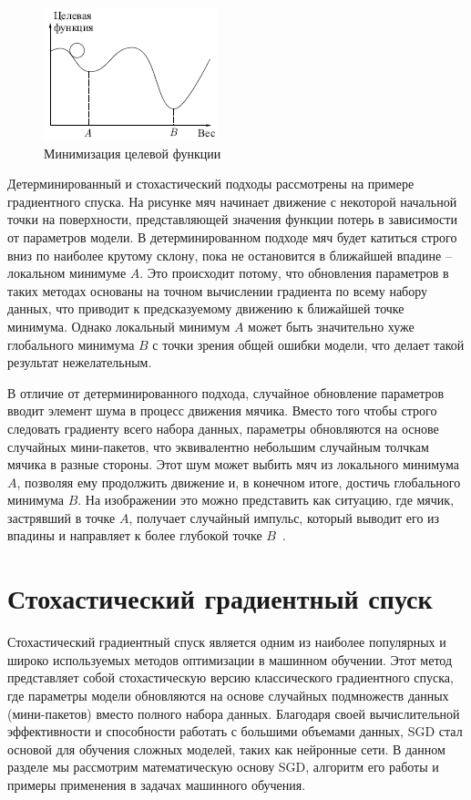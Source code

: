 \documentclass[11pt,a4paper]{article}
\begin{document}
\begin{figure}[H]
    \centering
    \includegraphics[width=0.5\linewidth]{local-minimum-ball.png}
    \caption{Минимизация целевой функции}
    \label{fig:fig1}
\end{figure}

Детерминированный и стохастический подходы рассмотрены на примере градиентного спуска. На рисунке мяч начинает движение с некоторой начальной точки на поверхности, представляющей значения функции потерь в зависимости от параметров модели. В детерминированном подходе мяч будет катиться строго вниз по наиболее крутому склону, пока не остановится в ближайшей впадине -- локальном минимуме \(A\). Это происходит потому, что обновления параметров в таких методах основаны на точном вычислении градиента по всему набору данных, что приводит к предсказуемому движению к ближайшей точке минимума. Однако локальный минимум \(A\) может быть значительно хуже глобального минимума \(B\) с точки зрения общей ошибки модели, что делает такой результат нежелательным.

В отличие от детерминированного подхода, случайное обновление параметров вводит элемент шума в процесс движения мячика. Вместо того чтобы строго следовать градиенту всего набора данных, параметры обновляются на основе случайных мини-пакетов, что эквивалентно небольшим случайным толчкам мячика в разные стороны. Этот шум может выбить мяч из локального минимума \(A\), позволяя ему продолжить движение и, в конечном итоге, достичь глобального минимума \(B\). На изображении это можно представить как ситуацию, где мячик, застрявший в точке \(A\), получает случайный импульс, который выводит его из впадины и направляет к более глубокой точке \(B\)~\cite{intuit}.


\section{Стохастический градиентный спуск}

Стохастический градиентный спуск является одним из наиболее популярных и широко используемых методов оптимизации в машинном обучении. Этот метод представляет собой стохастическую версию классического градиентного спуска, где параметры модели обновляются на основе случайных подмножеств данных (мини-пакетов) вместо полного набора данных. Благодаря своей вычислительной эффективности и способности работать с большими объемами данных, SGD стал основой для обучения сложных моделей, таких как нейронные сети. В данном разделе мы рассмотрим математическую основу SGD, алгоритм его работы и примеры применения в задачах машинного обучения.
\end{document}
